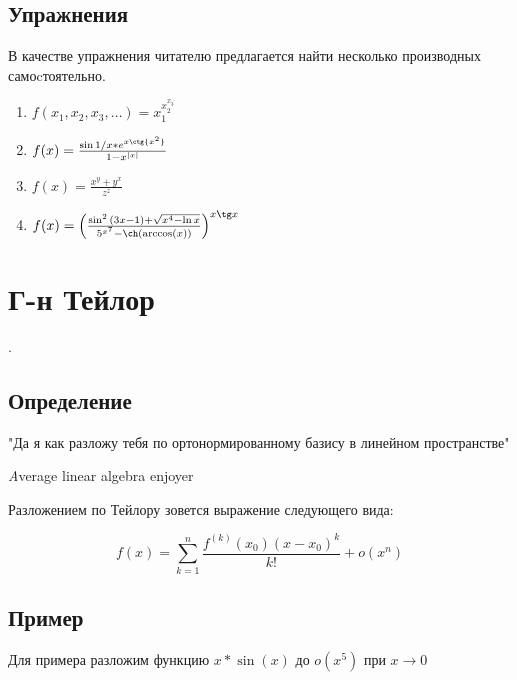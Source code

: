 \section{Упражнения}
В качестве упражнения читателю предлагается найти несколько производных самоcтоятельно.

\begin{enumerate}
	\item $ f(x_1,x_2,x_3,\dots) = x_1^{x_2^{x_3^{\dots}}}$
	\item $ f(x) = \frac{\sin{1/x} * e^{x \ctg{x^2}}}{1 - x^{|x|}} $
	\item $ f(x) = \frac{x^y + y^x}{z^z} $
 	\item $ f(x) = \left({
 	\frac{ \sin^2{(3x-1)} + \sqrt{x^4 - \ln x}}
 	{5^{x^7} - \ch(\arccos(x))}
 }\right)^{x\tg x}$\cite{Semestr}
\end{enumerate}
\chapter{Г-н Тейлор}.
\section{Определение}
\epigraph{"Да я как разложу тебя по ортонормированному базису в линейном пространстве"}{{\textit Average linear algebra enjoyer}}

Разложением по Тейлору зовется выражение следующего вида:

$$
	f(x) = \sum_{k=1}^{n} \frac{f^{(k)}(x_0)  (x-x_0)^k}{k!} + o(x^n)
$$

\section{Пример}
Для примера разложим функцию $ x * \sin(x) $ до $ o(x^5)$ при $ x \rightarrow 0 $